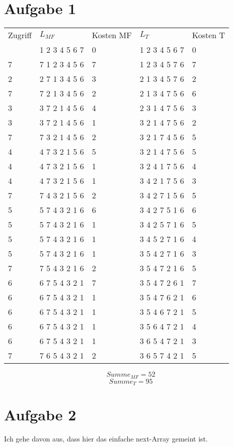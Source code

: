 \documentclass[10pt,a4paper]{article}
\begin{document}
\section{Aufgabe 1}
\begin{tabular}{l|l|l|l|l}
  Zugriff & $L_{MF}$ & Kosten MF & $L_{T}$ & Kosten T\\
  & 1 2 3 4 5 6 7 & 0 & 1 2 3 4 5 6 7 & 0\\
  7 & 7 1 2 3 4 5 6 & 7 & 1 2 3 4 5 7 6 & 7\\
  2 & 2 7 1 3 4 5 6 & 3 & 2 1 3 4 5 7 6 & 2\\
  7 & 7 2 1 3 4 5 6 & 2 & 2 1 3 4 7 5 6 & 6\\
  3 & 3 7 2 1 4 5 6 & 4 & 2 3 1 4 7 5 6 & 3\\
  3 & 3 7 2 1 4 5 6 & 1 & 3 2 1 4 7 5 6 & 2\\
  7 & 7 3 2 1 4 5 6 & 2 & 3 2 1 7 4 5 6 & 5\\
  4 & 4 7 3 2 1 5 6 & 5 & 3 2 1 4 7 5 6 & 5\\
  4 & 4 7 3 2 1 5 6 & 1 & 3 2 4 1 7 5 6 & 4\\
  4 & 4 7 3 2 1 5 6 & 1 & 3 4 2 1 7 5 6 & 3\\
  7 & 7 4 3 2 1 5 6 & 2 & 3 4 2 7 1 5 6 & 5\\
  5 & 5 7 4 3 2 1 6 & 6 & 3 4 2 7 5 1 6 & 6\\
  5 & 5 7 4 3 2 1 6 & 1 & 3 4 2 5 7 1 6 & 5\\
  5 & 5 7 4 3 2 1 6 & 1 & 3 4 5 2 7 1 6 & 4\\
  5 & 5 7 4 3 2 1 6 & 1 & 3 5 4 2 7 1 6 & 3\\
  7 & 7 5 4 3 2 1 6 & 2 & 3 5 4 7 2 1 6 & 5\\
  6 & 6 7 5 4 3 2 1 & 7 & 3 5 4 7 2 6 1 & 7\\
  6 & 6 7 5 4 3 2 1 & 1 & 3 5 4 7 6 2 1 & 6\\
  6 & 6 7 5 4 3 2 1 & 1 & 3 5 4 6 7 2 1 & 5\\
  6 & 6 7 5 4 3 2 1 & 1 & 3 5 6 4 7 2 1 & 4\\
  6 & 6 7 5 4 3 2 1 & 1 & 3 6 5 4 7 2 1 & 3\\
  7 & 7 6 5 4 3 2 1 & 2 & 3 6 5 7 4 2 1 & 5\\
\end{tabular}
\begin{equation}
  Summe_{MF} = 52
\end{equation}
\begin{equation}
  Summe_{T} = 95
\end{equation}

\section{Aufgabe 2}
Ich gehe davon aus, dass hier das einfache next-Array gemeint ist.
\end{document}
